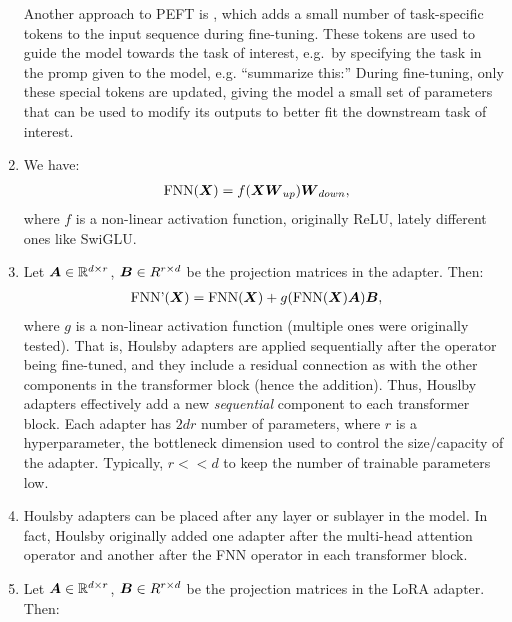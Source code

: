 \documentclass[11pt,a4paper]{article}
\newcommand\op[1]{\operatorname{#1}}
\begin{document}
\begin{enumerate}[label=(\alph*)]
          Another approach to PEFT is , which adds a
          small number of task-specific tokens to the input sequence during
          fine-tuning.
          These tokens are used to guide the model towards the task of
          interest, e.g.\ by specifying the task in the promp given to the
          model, e.g. ``summarize this:''
          During fine-tuning, only these special tokens are updated, giving
          the model a small set of parameters that can be used to modify its
          outputs to better fit the downstream task of interest.
    \item We have:
          \begin{align}
              \op{FNN}(\mX) & = f(\mX\mW_{up})\mW_{down},
          \end{align}
          where $f$ is a non-linear activation function, originally ReLU,
          lately different ones like SwiGLU.
    \item Let ${\boldsymbol{A}} \in \mathbb{R}^{d\times r}$, ${\boldsymbol{B}} \in R^{r\times d}$ be the
          projection matrices in the adapter.
          Then:
          \begin{align}\label{houlsby}
              \op{FNN'}(\mX) & =  \op{FNN}(\mX) + g(\op{FNN}(\mX)\mA)\mB,
          \end{align}
          where $g$ is a non-linear activation function (multiple ones were
          originally tested).
          That is, Houlsby adapters are applied sequentially after the operator
          being fine-tuned, and they include a residual connection as with the
          other components in the transformer block (hence the addition).
          Thus, Houslby adapters effectively add a new \emph{sequential}
          component to each transformer block.
          Each adapter has $2dr$ number of parameters, where $r$ is
          a hyperparameter, the bottleneck dimension used to control the
          size/capacity of the adapter.
          Typically, $r << d$ to keep the number of trainable parameters low.
    \item Houlsby adapters can be placed after any layer or sublayer in the
          model. In fact, Houlsby originally added one adapter after the
          multi-head attention operator and another after the FNN operator in
          each transformer block.
    \item Let ${\boldsymbol{A}} \in \mathbb{R}^{d\times r}$, ${\boldsymbol{B}} \in R^{r\times d}$ be the
          projection matrices in the LoRA adapter.
          Then:
          \begin{align}\label{lora}

\end{align}
\end{enumerate}
\end{document}
